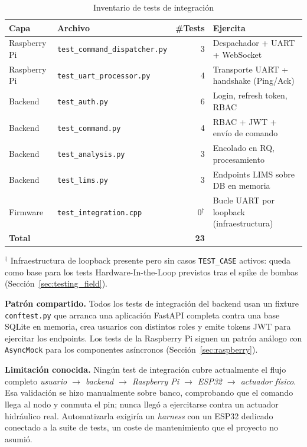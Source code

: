 \begin{table}[H]
    \centering
    \caption{Inventario de tests de integración}
    \begin{tabularx}{\textwidth}{lXrl}
        \toprule
        \textbf{Capa}           & \textbf{Archivo}                       & \textbf{\#Tests} & \textbf{Ejercita} \\
        \midrule
        Raspberry Pi            & \texttt{test\_command\_dispatcher.py}  & 3  & Despachador + UART + WebSocket \\
        Raspberry Pi            & \texttt{test\_uart\_processor.py}      & 4  & Transporte UART + handshake (Ping/Ack) \\
        Backend                 & \texttt{test\_auth.py}                 & 6  & Login, refresh token, RBAC \\
        Backend                 & \texttt{test\_command.py}              & 4  & RBAC + JWT + envío de comando \\
        Backend                 & \texttt{test\_analysis.py}             & 3  & Encolado en RQ, procesamiento \\
        Backend                 & \texttt{test\_lims.py}                 & 3  & Endpoints LIMS sobre DB en memoria \\
        Firmware                & \texttt{test\_integration.cpp}         & 0$^{\dagger}$ & Bucle UART por loopback (infraestructura) \\
        \midrule
        \textbf{Total}          &                                        & \textbf{23} & \\
        \bottomrule
    \end{tabularx}
    \label{tab:tests_integration}
\end{table}

\noindent$^{\dagger}$ Infraestructura de loopback presente pero sin casos
\texttt{TEST\_CASE} activos: queda como base para los tests Hardware-In-the-Loop
previstos tras el spike de bombas (Sección~\ref{sec:testing_field}).

\textbf{Patrón compartido.} Todos los tests de integración del backend usan un
fixture \texttt{conftest.py} que arranca una aplicación FastAPI completa contra
una base SQLite en memoria, crea usuarios con distintos roles y emite tokens JWT
para ejercitar los endpoints. Los tests de la Raspberry Pi siguen un patrón análogo
con \texttt{AsyncMock} para los componentes asíncronos (Sección~\ref{sec:raspberry}).

\begin{warningbox}
\textbf{Limitación conocida.} Ningún test de integración cubre actualmente el flujo
completo \textit{usuario $\rightarrow$ backend $\rightarrow$ Raspberry Pi $\rightarrow$
ESP32 $\rightarrow$ actuador físico}. Esa validación se hizo manualmente sobre banco,
comprobando que el comando llega al nodo y conmuta el pin; nunca llegó a ejercitarse
contra un actuador hidráulico real. Automatizarla exigiría un \textit{harness} con un
ESP32 dedicado conectado a la suite de tests, un coste de mantenimiento que el
proyecto no asumió.
\end{warningbox}

